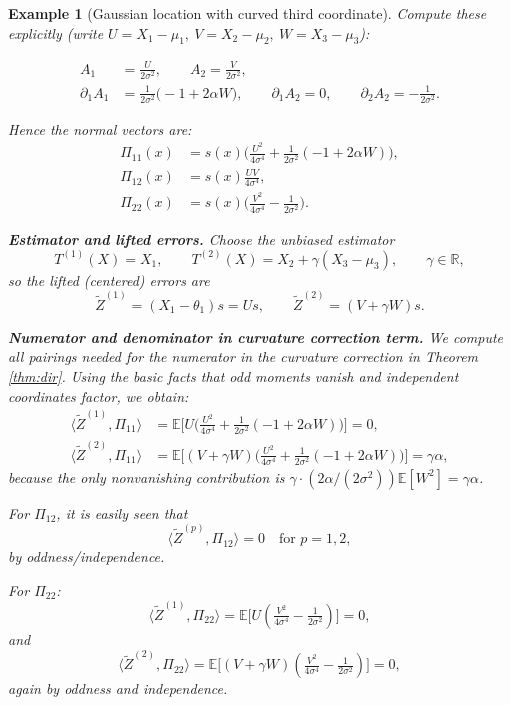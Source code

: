 \documentclass[pdflatex,sn-mathphys-num]{sn-jnl}%
\newcommand{\E}{\mathbb{E}}
\newcommand{\R}{\mathbb{R}}
\theoremstyle{thmstyleone}%
\theoremstyle{thmstyletwo}%
\newtheorem{example}{Example}%
\theoremstyle{thmstylethree}%
\begin{document}
\begin{example}[Gaussian location with curved third coordinate]
Compute these explicitly (write \(U=X_1-\mu_1,\ V=X_2-\mu_2,\ W=X_3-\mu_3\)):

\[
\begin{aligned}
A_1 &= \frac{U}{2\sigma^2},\qquad
A_2 = \frac{V}{2\sigma^2},\\[4pt]
\partial_1 A_1 &= \frac{1}{2\sigma^2}\big(-1 + 2\alpha W\big),\qquad
\partial_1 A_2 = 0,\qquad \partial_2 A_2 = -\frac{1}{2\sigma^2}.
\end{aligned}
\]

Hence the normal vectors are:
\[
\begin{aligned}
\Pi_{11}(x) &= s(x)\Big(\frac{U^2}{4\sigma^4} + \frac{1}{2\sigma^2}(-1 + 2\alpha W)\Big),\\[4pt]
\Pi_{12}(x) &= s(x)\frac{UV}{4\sigma^4},\\[4pt]
\Pi_{22}(x) &= s(x)\Big(\frac{V^2}{4\sigma^4} - \frac{1}{2\sigma^2}\Big).
\end{aligned}
\]

\noindent
\textbf{Estimator and lifted errors.}
Choose the unbiased estimator
\[
T^{(1)}(X)=X_1,\qquad T^{(2)}(X)=X_2+\gamma(X_3-\mu_3),
\qquad \gamma\in\R,
\]
so the lifted (centered) errors are
\[
\widetilde Z^{(1)}=(X_1-\theta_1)s = U s,\qquad
\widetilde Z^{(2)}=(V+\gamma W)s.
\]

\noindent
\textbf{Numerator and denominator in curvature correction term.}
We compute all pairings needed for the numerator in the curvature correction in Theorem \ref{thm:dir}. Using the basic facts that odd moments vanish and independent coordinates factor, we obtain:
\[
\begin{aligned}
\langle\widetilde Z^{(1)},\Pi_{11}\rangle
&= \E\Big[U\Big(\frac{U^2}{4\sigma^4}+\frac{1}{2\sigma^2}(-1+2\alpha W)\Big)\Big] = 0,\\[4pt]
\langle\widetilde Z^{(2)},\Pi_{11}\rangle
&= \E\Big[(V+\gamma W)\Big(\frac{U^2}{4\sigma^4}+\frac{1}{2\sigma^2}(-1+2\alpha W)\Big)\Big]
= \gamma\alpha,
\end{aligned}
\]
because the only nonvanishing contribution is \(\gamma\cdot(2\alpha/(2\sigma^2))\E[W^2]=\gamma\alpha\).

For \(\Pi_{12}\), it is easily seen that
\[
\langle\widetilde Z^{(p)},\Pi_{12}\rangle
=  0
\quad\text{for }p=1,2,
\]
by oddness/independence.

For \(\Pi_{22}\):
\[
\langle\widetilde Z^{(1)},\Pi_{22}\rangle
= \E\big[U(\tfrac{V^2}{4\sigma^4}-\tfrac{1}{2\sigma^2})\big] = 0,
\]
and
\[
\langle\widetilde Z^{(2)},\Pi_{22}\rangle
= \E\big[(V+\gamma W)(\tfrac{V^2}{4\sigma^4}-\tfrac{1}{2\sigma^2})\big] = 0,
\]
again by oddness and independence.


\end{example}
\end{document}
